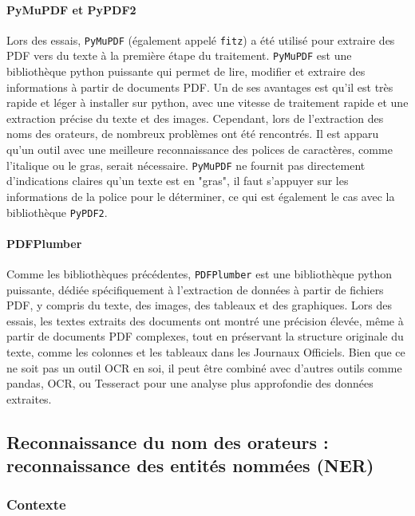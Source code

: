 \paragraph{PyMuPDF et PyPDF2}  
Lors des essais, \texttt{PyMuPDF} (également appelé \texttt{fitz}) a été utilisé pour extraire des \gls{PDF} vers du texte à la première étape du traitement. \texttt{PyMuPDF} est une bibliothèque \gls{python} puissante qui permet de lire, modifier et extraire des informations à partir de documents \gls{PDF}. Un de ses avantages est qu'il est très rapide et léger à installer sur \gls{python}, avec une vitesse de traitement rapide et une extraction précise du texte et des images. Cependant, lors de l'extraction des noms des orateurs, de nombreux problèmes ont été rencontrés. Il est apparu qu'un outil avec une meilleure reconnaissance des polices de caractères, comme l'italique ou le gras, serait nécessaire. \texttt{PyMuPDF} ne fournit pas directement d'indications claires qu'un texte est en "gras", il faut s'appuyer sur les informations de la police pour le déterminer, ce qui est également le cas avec la \gls{bibliothèque} \texttt{PyPDF2}.

\paragraph{PDFPlumber}  
Comme les bibliothèques précédentes, \texttt{PDFPlumber} est une \gls{bibliothèque} \gls{python} puissante, dédiée spécifiquement à l'extraction de données à partir de fichiers \gls{PDF}, y compris du texte, des images, des tableaux et des graphiques. Lors des essais, les textes extraits des documents ont montré une précision élevée, même à partir de documents \gls{PDF} complexes, tout en préservant la structure originale du texte, comme les colonnes et les tableaux dans les Journaux Officiels. Bien que ce ne soit pas un outil \gls{OCR} en soi, il peut être combiné avec d'autres outils comme \gls{pandas}, \gls{OCR}, ou \gls{Tesseract} pour une analyse plus approfondie des données extraites.

\subsection{Reconnaissance du nom des orateurs : reconnaissance des entités nommées (NER)}

\subsubsection{Contexte}

